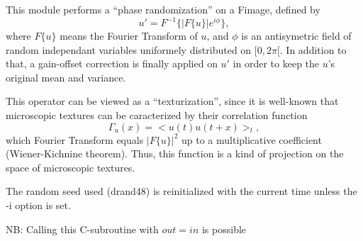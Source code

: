 This module performs a ``phase randomization'' on a Fimage, defined by
$$u' = F^{-1} \{ |F \{ u \} | e^{i \phi} \} ,$$
where $F \{u\}$ means the Fourier Transform of $u$, and $\phi$ is an
antisymetric field of random independant variables uniformely distributed
on $[0,2\pi[$.
In addition to that, a gain-offset correction is finally applied on $u'$ 
in order to keep the $u$'s original mean and variance.

\vskip 0.3cm

This operator can be viewed as a ``texturization'', since it is well-known
that microscopic textures can be caracterized by their correlation function
$$\Gamma_u(x) = <u(t)u(t+x)>_t,$$
which Fourier Transform equals $| F \{ u \} | ^2$ up to a multiplicative 
coefficient (Wiener-Kichnine theorem). Thus, this function is a kind of 
projection on the space of microscopic textures.

\vskip 0.3cm

The random seed used ({\sf drand48}) is reinitialized with the current time
unless the -i option is set.

\vskip 0.5cm

NB: Calling this C-subroutine with $out=in$ is possible 

